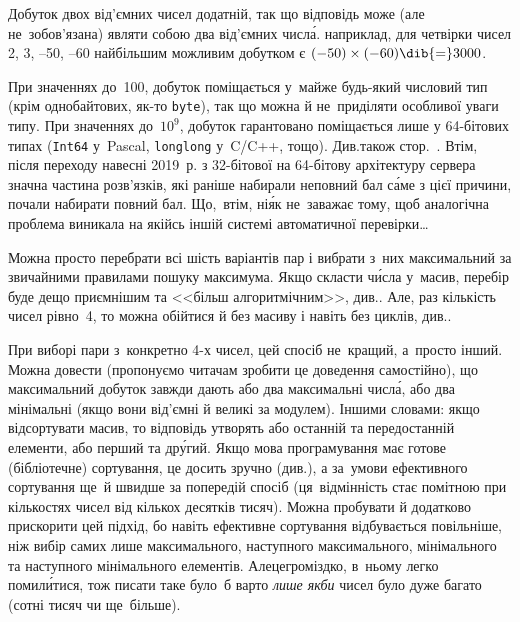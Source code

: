 \Tutorial	
{}
Добуток двох від'ємних чисел додатній, так що відповідь може (але не~зобов'язана)
являти собою два від'ємних числ\'{а}. наприклад, для четвірки чисел 2, 3, --50, --60 найбільшим можливим добутком є ${({-}50)\times({-}60)}\dib{{=}}3000$.

 При значеннях до~100, добуток поміщається у~майже будь-який числовий тип (крім однобайтових, як-то \verb"byte"), так що можна й не~приділяти особливої уваги типу. При значеннях до~$10^9$, добуток гарантовано поміщається лише у 64-\nolinebreak[3]бітових типах (\texttt{Int64} у~Pascal, \texttt{long\nolinebreak[3] long} у~C/C++, тощо). Див.\nolinebreak[3] також стор.~\pageref{text:overflow-example}. Втім, після переходу навесні 2019~р. з \mbox{32-}\nolinebreak[3]біто\-вої на \mbox{64-}\nolinebreak[3]біто\-ву архітектуру сервера значна частина розв'язків, які раніше набирали неповний бал с\'{а}ме з цієї причини, почали набирати повний бал. Що,~втім, ні\'{я}к не~заважає тому, щоб аналогічна проблема виникала на якійсь іншій системі автоматичної перевірки\dots{}

Можна просто перебрати всі шість варіантів пар і вибрати з~них максимальний за звичайними правилами пошуку максимума. Якщо скласти ч\'{и}сла у~масив, перебір буде дещо приємнішим та <<більш алгоритмічним>>, див.\nolinebreak[3] . Але, раз кількість чисел рівно~4, то можна обійтися й без масиву і навіть без циклів, див.\nolinebreak[3] .

 При виборі пари з~конкретно \mbox{4-х} чисел, цей спосіб не~кращий, а~просто інший. Можна довести (пропонуємо читачам зробити це доведення самостійно), що максимальний добуток завжди дають або два максимальні числ\'{а}, або два мінімальні (якщо вони від'ємні й великі за модулем). Іншими словами: якщо відсортувати масив, то відповідь утворять або останній та передостанній елементи, 
або перший та др\'{у}гий. 
Якщо мова програмування має готове (бібліотечне) сортування, це досить зручно (див.\nolinebreak[3] ), а за~умови ефективного сортування ще~й швидше за попередій спосіб (ця~відмінність стає помітною при кількостях чисел від кількох десятків тисяч). Можна пробувати й додатково прискорити цей підхід, бо навіть ефективне сортування відбувається повільніше, ніж вибір самих лише максимального, наступного максимального, мінімального та наступного мінімального елементів. Але\nolinebreak[2] це\nolinebreak[2] громіздко, в~ньому легко помил\'{и}тися, тож писати таке було~б варто \emph{лише якби} чисел було дуже багато (сотні тисяч чи ще~більше).